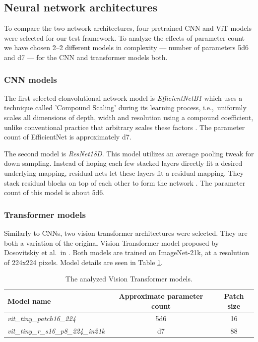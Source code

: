 \documentclass{article}
\begin{document}
\subsection{Neural network architectures}
To compare the two network architectures, four pretrained CNN and ViT models were selected for our test framework. To analyze the effects of parameter count we have chosen 2--2 different models in complexity --- number of parameters  \num{5d6} and \num{d7} --- for the CNN and transformer models both.

\subsubsection{CNN models}
The first selected clonvolutional network model is \textit{EfficientNetB1} which uses a technique called 'Compound Scaling' during its learning process, i.e.,~uniformly scales all dimensions of depth, width and resolution using a compound coefficient, unlike conventional practice that arbitrary scales these factors \cite{Tan2019}. The parameter count of EfficientNet is approximately \num{d7}.

The second model is \textit{ResNet18D}. This model utilizes an average pooling tweak for down sampling. Instead of hoping each few stacked layers directly fit a desired underlying mapping, residual nets let these layers fit a residual mapping. They stack residual blocks on top of each other to form the network \cite{He2016}. The parameter count of this model is about \num{5d6}.

\subsubsection{Transformer models}
Similarly to CNNs, two vision transformer architectures were selected. They are both a variation of the original Vision Transformer model proposed by Dosovitskiy et al.~in \cite{Dosovitskiy2021}. Both models are trained on ImageNet-21k, at a resolution of 224x224 pixels. Model details are seen in Table \ref{tab:vit_models}.

\begin{table}
\centering
\caption{The analyzed Vision Transformer models.\label{tab:vit_models}}
\begin{tabular}{|l|c|c|}
\hline
Model name & Approximate parameter count & Patch size \\ \hline
\textit{vit\_tiny\_patch16\_224} & \num{5d6} & 16 \\ \hline
\textit{vit\_tiny\_r\_s16\_p8\_224\_in21k} &  \num{d7} & 88 \\ \hline
\end{tabular}
\end{table}
\end{document}
